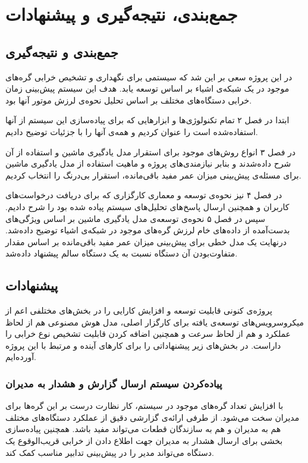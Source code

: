 \chapter{جمع‌بندی، نتیجه‌گیری و پیشنهادات}


\section{جمع‌بندی و نتیجه‌گیری}
در این پروژه سعی بر این شد که سیستمی برای نگهداری و تشخیص خرابی گره‌های موجود در یک شبکه‌ی اشیاء بر اساس \cite{jung2017vibration} توسعه یابد. هدف این سیستم پیش‌بینی زمان خرابی دستگاه‌های مختلف بر اساس تحلیل نحوه‌ی لرزش موتور آنها بود.

ابتدا در فصل ۲ تمام تکنولوژی‌ها و ابزارهایی که برای پیاده‌سازی این سیستم از آنها استفاده‌شده است را عنوان کردیم و همه‌ی آنها را با جزئیات توضیح دادیم.

در فصل ۳ انواع روش‌های موجود برای استقرار مدل یادگیری ماشین و استفاده از آن شرح داده‌شدند و بنابر نیازمندی‌های پروژه و ماهیت استفاده از مدل یادگیری ماشین برای مسئله‌ی پیش‌بینی میزان عمر مفید باقی‌مانده، استقرار بی‌درنگ را انتخاب کردیم.

در فصل ۴ نیز نحوه‌ی توسعه و معماری کارگزاری که برای دریافت درخواست‌های کاربران و همچنین ارسال پاسخ‌های تحلیل‌های سیستم پیاده شده‌ بود را شرح دادیم. سپس در فصل ۵ نحوه‌ی توسعه‌ی مدل یادگیری ماشین بر اساس ویژگی‌های بدست‌آمده از داده‌های خام لرزش گره‌های موجود در شبکه‌ی اشیاء توضیح داده‌شد. درنهایت یک مدل خطی برای پیش‌بینی میزان عمر مفید باقی‌مانده بر اساس مقدار متفاوت‌بودن آن دستگاه نسبت به یک دستگاه سالم پیشنهاد داده‌شد.


\section{پیشنهادات}

پروژه‌ی کنونی قابلیت توسعه و افزایش کارایی را در بخش‌های مختلفی اعم از میکروسرویس‌های توسعه‌ی یافته برای کارگزار اصلی، مدل هوش مصنوعی هم از لحاظ عملکرد و هم از لحاظ سرعت و همچنین اضافه کردن قابلیت تشخیص نوع خرابی را داراست. در بخش‌های زیر پیشنهاداتی را برای کارهای آینده و مرتبط با این پروژه آورده‌ایم.

\subsection{پیاده‌کردن سیستم ارسال گزارش و هشدار به مدیران}
با افزایش تعداد گره‌های موجود در سیستم، کار نظارت درست بر این گره‌ها برای مدیران سخت می‌شود. از طرفی ارائه‌ی گزارشی دقیق از عملکرد دستگاه‌های مختلف هم به مدیران و هم به سازندگان قطعات می‌تواند مفید باشد. همچنین پیاده‌سازی بخشی برای ارسال هشدار به مدیران جهت اطلاع دادن از خرابی قریب‌الوقوع یک دستگاه می‌تواند مدیر را در پیش‌بینی تدابیر مناسب کمک کند.

